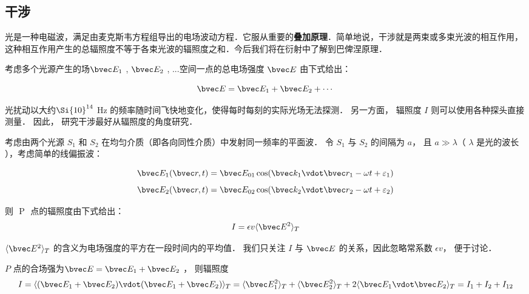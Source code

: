 
\subsection{干涉}

光是一种电磁波，满足由麦克斯韦方程组导出的电场波动方程．它服从重要的\textbf{叠加原理}．简单地说，干涉就是两束或多束光波的相互作用，这种相互作用产生的总辐照度不等于各束光波的辐照度之和．今后我们将在衍射中了解到巴俾涅原理．

考虑多个光源产生的场$\bvec E_1$ , $\bvec E_2$ , ...空间一点的总电场强度 $\bvec E$ 由下式给出：

\begin{equation}
\bvec E = \bvec E_1 + \bvec E_2 + \cdots
\end{equation}

光扰动以大约$\Si{10}^{14}$ Hz 的频率随时间飞快地变化，使得每时每刻的实际光场无法探测． 另一方面， 辐照度 $I$ 则可以使用各种探头直接测量． 因此， 研究干涉最好从辐照度的角度研究．

考虑由两个光源 $S_1$ 和 $S_2$ 在均匀介质（即各向同性介质）中发射同一频率的平面波． 令 $S_1$ 与 $S_2$ 的间隔为 $a$， 且 $ a \gg \lambda $（ $\lambda$ 是光的波长 ），考虑简单的线偏振波：

$$ \bvec E_1 ( \bvec r , t) = \bvec E_{01} \cos (\bvec k_1 \vdot \bvec r_1 - \omega t + \varepsilon_1 )$$
$$ \bvec E_2 ( \bvec r , t) = \bvec E_{02} \cos (\bvec k_2 \vdot \bvec r_2 - \omega t + \varepsilon_2 )$$

则 $ $ P $ $ 点的辐照度由下式给出：
\begin{equation}
 I = \epsilon v \langle \bvec E^2 \rangle _T 
\end{equation}

$\langle \bvec E^2 \rangle _T$ 的含义为电场强度的平方在一段时间内的平均值． 我们只关注 $ I $ 与 $ \bvec E $ 的关系，因此忽略常系数 $ \epsilon v$， 便于讨论． 

 $ P $ 点的合场强为$ \bvec E = \bvec E_1 + \bvec E_2 $ ， 则辐照度  
\begin{equation}
I = \langle( \bvec E_1 + \bvec E_2)\vdot( \bvec E_1 + \bvec E_2 )\rangle _T \\
 = \langle \bvec E_1^2 \rangle _T + \langle \bvec E_2^2 \rangle _T + 2\langle \bvec E_1 \vdot \bvec E_2 \rangle _T = I_1 + I_2 + I_{12}
\end{equation}

